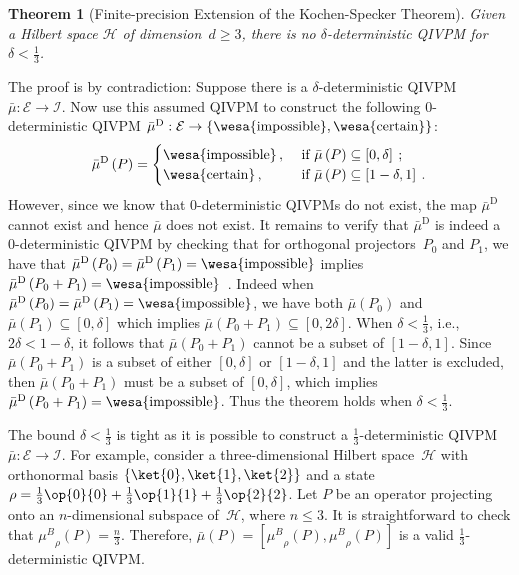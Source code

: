 \documentclass[english,reprint, aps, prl,superscriptaddress, showpacs,
showkeys, longbibliography, amsmath, amssymb, floatfix]{revtex4-1}
\theoremstyle{plain}
\newtheorem{thm}{Theorem}
\theoremstyle{definition}
\newcommand{\Hilb}{\mathcal{H}}
\newcommand{\events}{\ensuremath{\mathcal{E}}}
\newcommand{\imposs}{{\text{\wesa{impossible}}}}
\newcommand{\necess}{{\text{\wesa{certain}}}}
\newcommand{\proj}[1]{\op{#1}{#1}}
\newcommand{\muB}{\ensuremath{\mu^{B}}}
\begin{document}
\begin{thm}[Finite-precision Extension of the Kochen-Specker
  Theorem] \label{cor:Kochen-Specker-IVPM} Given a Hilbert space
  $\Hilb$ of dimension~$d\ge3$, there is no $\delta$-deterministic
  QIVPM for $\delta<\frac{1}{3}$.\end{thm}

The proof is by contradiction: Suppose there is a
$\delta$-deterministic
QIVPM~$\bar{\mu}:\events\rightarrow\mathscr{I}$. Now use this
assumed QIVPM to construct the following 0-deterministic QIVPM
$\bar{\mu}^{\textrm{D}}:\events\rightarrow\left\{
  \imposs,\necess\right\}$:
\[
\bar{\mu}^{\textrm{D}}\left(P\right)=\begin{cases}
\imposs\,, & \textrm{ if }\bar{\mu}\left(P\right)\subseteq\left[0,\delta\right]\:;\\
\necess\,, & \textrm{ if }\bar{\mu}\left(P\right)\subseteq\left[1-\delta,1\right]\:.
\end{cases}
\]
However, since we know that 0-deterministic QIVPMs do not exist, the
map $\bar{\mu}^{\textrm{D}}$ cannot exist and hence $\bar{\mu}$ does
not exist. It remains to verify that $\bar{\mu}^{\textrm{D}}$ is
indeed a 0-deterministic QIVPM by checking that for orthogonal
projectors~$P_{0}$ and $P_{1}$, we have that
$\bar{\mu}^{\textrm{D}}\left(P_{0}\right)=\bar{\mu}^{\textrm{D}}\left(P_{1}\right)=\imposs$
implies
$\bar{\mu}^{\textrm{D}}\left(P_{0}+P_{1}\right)=\imposs$~\citep{TaiThesis2018}. Indeed
when
$\bar{\mu}^{\textrm{D}}\left(P_{0}\right)=\bar{\mu}^{\textrm{D}}\left(P_{1}\right)=\imposs$,
we have both $\bar{\mu}\left(P_{0}\right)$ and
$\bar{\mu}\left(P_{1}\right)\subseteq\left[0,\delta\right]$ which
implies
$\bar{\mu}\left(P_{0}+P_{1}\right)\subseteq\left[0,2\delta\right]$.
When $\delta<\frac{1}{3}$, i.e., $2\delta<1-\delta$, it follows that
$\bar{\mu}\left(P_{0}+P_{1}\right)$ cannot be a subset of
$\left[1-\delta,1\right]$. Since $\bar{\mu}\left(P_{0}+P_{1}\right)$
is a subset of either $\left[0,\delta\right]$ or
$\left[1-\delta,1\right]$ and the latter is excluded, then
$\bar{\mu}\left(P_{0}+P_{1}\right)$ must be a subset of
$\left[0,\delta\right]$, which implies
$\bar{\mu}^{\textrm{D}}\left(P_{0}+P_{1}\right)=\imposs$. Thus the
theorem holds when $\delta<\frac{1}{3}$.

The bound $\delta < \frac{1}{3}$ is tight as it is possible to
construct a $\frac{1}{3}$-deterministic QIVPM
$\bar{\mu}:\events\rightarrow\mathscr{I}$. For example, consider a
three-dimensional Hilbert space~$\Hilb$ with orthonormal basis
$\left\{\ket{0},\ket{1},\ket{2}\right\}$ and a state
$\rho=\frac{1}{3}\proj{0}+\frac{1}{3}\proj{1}+\frac{1}{3}\proj{2}$.
Let $P$ be an operator projecting onto an $n$-dimensional subspace
of~$\Hilb$, where $n \leq 3$. It is straightforward to check that
$\muB_{\rho}\left(P\right)=\frac{n}{3}$. Therefore,
$\bar{\mu}\left(P\right)=\left[\muB_{\rho}\left(P\right),\muB_{\rho}\left(P\right)\right]$
is a valid $\frac{1}{3}$-deterministic QIVPM.
\end{document}

